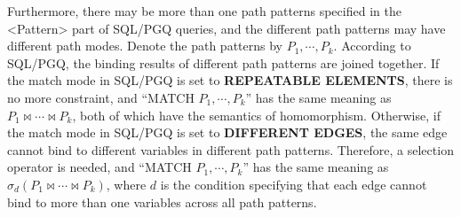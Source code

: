 Furthermore, there may be more than one path patterns specified in the <Pattern> part of SQL/PGQ queries, and the different path patterns may have different path modes.
Denote the path patterns by $P_1, \cdots, P_k$.
According to SQL/PGQ, the binding results of different path patterns are joined together.
If the match mode in SQL/PGQ is set to \textbf{REPEATABLE ELEMENTS}, there is no more constraint, and ``MATCH $P_1, \cdots, P_k$'' has the same meaning as $P_1 \Join \cdots \Join P_k$, both of which have the semantics of homomorphism.
Otherwise, if the match mode in SQL/PGQ is set to \textbf{DIFFERENT EDGES}, the same edge cannot bind to different variables in different path patterns.
Therefore, a selection operator is needed, and ``MATCH $P_1, \cdots, P_k$'' has the same meaning as $\sigma_{d}(P_1 \Join \cdots \Join P_k)$, where $d$ is the condition specifying that each edge cannot bind to more than one variables across all path patterns.
\fi
